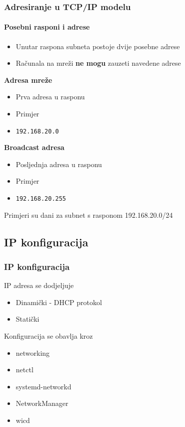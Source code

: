 \documentclass[t,table,usenames,dvipsnames]{beamer}
\begin{document}
\begin{frame}
	\frametitle{Adresiranje u TCP/IP modelu}
	\framesubtitle{Posebni rasponi i adrese}
	\begin{itemize}
		\item Unutar raspona subneta postoje dvije posebne adrese
		\item Računala na mreži \textbf{ne mogu} zauzeti navedene adrese
	\end{itemize}
	\vfill
	\textbf{Adresa mreže}
	\begin{itemize}
		\item Prva adresa u rasponu
		\item Primjer
		\item[] \texttt{192.168.20.0}
	\end{itemize}
	\textbf{Broadcast adresa}
	\begin{itemize}
		\item Posljednja adresa u rasponu
		\item Primjer
		\item[] \texttt{192.168.20.255}
	\end{itemize}
	{\small Primjeri su dani za subnet s rasponom 192.168.20.0/24}
\end{frame}

\subsection{IP konfiguracija}

\begin{frame}
	\frametitle{IP konfiguracija}
	IP adresa se dodjeljuje
	\begin{itemize}
		\item Dinamički - DHCP protokol
		\item Statički
	\end{itemize}
	\vspace{1em}
	Konfiguracija se obavlja kroz
	\begin{itemize}
		\item networking
		\item netctl
		\item systemd-networkd
	\end{itemize}
	\begin{itemize}
		\item NetworkManager
		\item wicd
	\end{itemize}
\end{frame}
\end{document}
